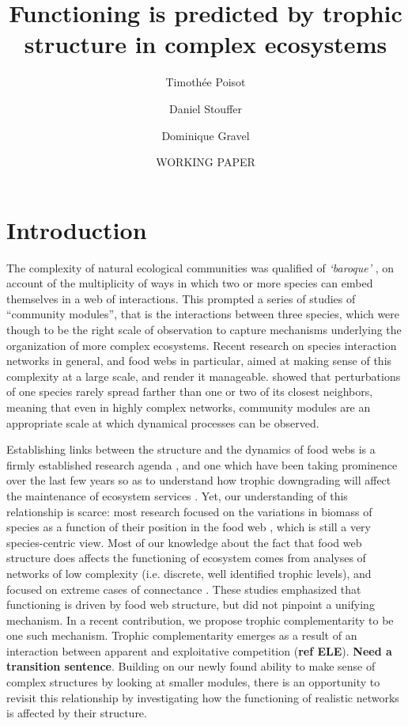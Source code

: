 \documentclass[12pt]{article}
\title{Functioning is predicted by trophic structure in complex ecosystems}
\author{Timoth\'ee Poisot\and Daniel Stouffer\and Dominique Gravel}
\date{WORKING PAPER}
\begin{document}
\maketitle\doublespacing

\section{Introduction}

The complexity of natural ecological communities was qualified of
\emph{`baroque'} \parencite{holt_community_1997}, on account of the
multiplicity of ways in which two or more species can embed themselves in a
web of interactions. This prompted a series of studies of ``community
modules'', that is the interactions between three species, which were though
to be the right scale of observation to capture mechanisms underlying the
organization of more complex ecosystems. Recent research on species
interaction networks in general, and food webs in particular, aimed at making
sense of this complexity at a large scale, and render it manageable.
\textcite{berlow_simple_2009} showed that perturbations of one species rarely
spread farther than one or two of its closest neighbors, meaning that even in
highly complex networks, community modules are an appropriate scale at which
dynamical processes can be observed.

Establishing links between the structure and the dynamics of food webs is a
firmly established research agenda \parencite{Pascual2006}, and one which have
been taking prominence over the last few years so as to understand how trophic
downgrading will affect the maintenance of ecosystem services
\parencite{Estes2011}. Yet, our understanding of this relationship is scarce:
most research focused on the variations in biomass of species as a function of
their position in the food web \parencite{Williams2007,Berlow2009}, which is
still a very species-centric view. Most of our knowledge about the fact that
food web structure does affects the functioning of ecosystem comes from
analyses of networks of low complexity (i.e. discrete, well identified trophic
levels), and focused on extreme cases of connectance
\parencite[e.g.][]{Thebault2003,Thebault2007}. These studies emphasized that
functioning is driven by food web structure, but did not pinpoint a unifying
mechanism. In a recent contribution, we propose trophic complementarity to be
one such mechanism. Trophic complementarity emerges as a result of an
interaction between apparent and exploitative competition (\textbf{ref ELE}).
\textbf{Need a transition sentence}. Building on our newly found ability to
make sense of complex structures by looking at smaller modules, there is an
opportunity to revisit this relationship by investigating how the functioning
of realistic networks is affected by their structure.
\end{document}
